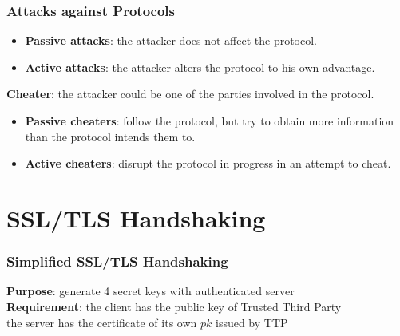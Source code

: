 \begin{frame}\frametitle{Attacks against Protocols}
\begin{itemize}
\item \textbf{Passive attacks}: the attacker does not affect the protocol.
\item \textbf{Active attacks}: the attacker alters the protocol to his own advantage.
\end{itemize}
\textbf{Cheater}: the attacker could be one of the parties involved in the protocol.
\begin{itemize}
\item \textbf{Passive cheaters}: follow the protocol, but try to obtain more information than the protocol intends them to.
\item \textbf{Active cheaters}: disrupt the protocol in progress in an attempt to cheat.
\end{itemize}
\end{frame}
\section{SSL/TLS Handshaking}
\begin{frame}\frametitle{Simplified SSL/TLS Handshaking}
\textbf{Purpose}: generate 4 secret keys with authenticated server\\
\textbf{Requirement}: the client has the public key of Trusted Third Party\\
the server has the certificate of its own $pk$ issued by TTP
\begin{figure}
\begin{center}

\end{center}
\end{figure}
\end{frame}
